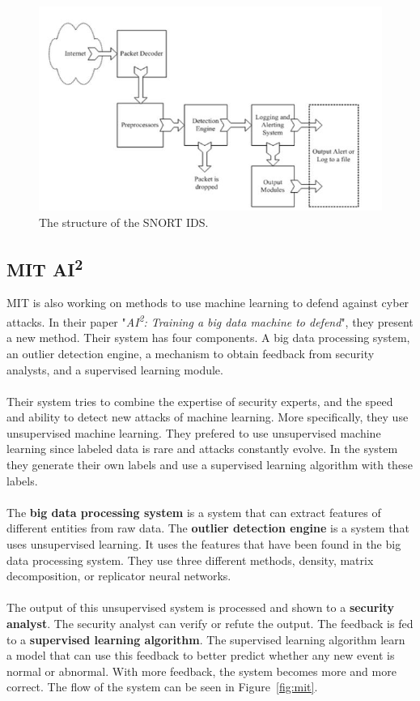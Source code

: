 \begin{figure}[H]
\centering
\includegraphics[width=1\textwidth]{Figures/snort}
\decoRule
\caption[The structure of the SNORT IDS]{The structure of the SNORT IDS. \cite{snortImg}}
\label{fig:snort}
\end{figure}

\subsection{MIT AI\textsuperscript{2}}
MIT is also working on methods to use machine learning to defend against cyber attacks. In their paper "\textit{AI\textsuperscript{2}: Training a big data machine to defend}", they present a new method. Their system has four components. A big data processing system, an outlier detection engine, a mechanism to obtain feedback from security analysts, and a supervised learning module.
\cite{veeramachaneniai2}\\
\\
Their system tries to combine the expertise of security experts, and the speed and ability to detect new attacks of machine learning. More specifically, they use unsupervised machine learning. They prefered to use unsupervised machine learning since labeled data is rare and attacks constantly evolve. In the system they generate their own labels and use a supervised learning algorithm with these labels. \\
\\
The \textbf{big data processing system} is a system that can extract features of different entities from raw data. The \textbf{outlier detection engine} is a system that uses unsupervised learning. It uses the features that have been found in the big data processing system. They use three different methods, density, matrix decomposition, or replicator neural networks. \cite{veeramachaneniai2} \\
\\
The output of this unsupervised system is processed and shown to a \textbf{security analyst}. The security analyst can verify or refute the output. The feedback is fed to a \textbf{supervised learning algorithm}. The supervised learning algorithm learn a model that can use this feedback to better predict whether any new event is normal or abnormal. With more feedback, the system becomes more and more correct. The flow of the system can be seen in Figure~\ref{fig:mit}. \cite{veeramachaneniai2}


